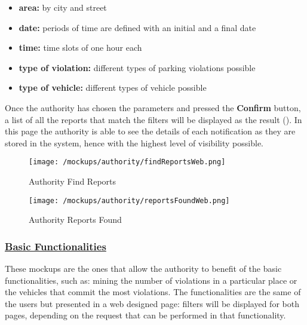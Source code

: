 				\begin{itemize}
					\item \textbf{area:} by city and street
					\item \textbf{date:} periods of time are defined with an initial and a final date
					\item \textbf{time:} time slots of one hour each
					\item \textbf{type of violation:} different types of parking violations possible
					\item \textbf{type of vehicle:} different types of vehicle possible
				\end{itemize} 
			
				Once the authority has chosen the parameters and pressed the \textbf{Confirm} button, a list of all the reports that match the filters will be displayed as the result (). In this page the authority is able to see the details of each notification as they are stored in the system, hence with the highest level of visibility possible.\\
				
				\newpage
				
				\begin{figure}[ht!]
					\centering
					\texttt{[image: /mockups/authority/findReportsWeb.png]}
					\caption{\label{fig:findReportsWeb} Authority Find Reports}
				\end{figure}
			
				\vspace{1cm}
			
				\begin{figure}[ht!]
					\centering
					\texttt{[image: /mockups/authority/reportsFoundWeb.png]}
					\caption{\label{fig:reportsFoundWeb} Authority Reports Found}
				\end{figure}
			
				\newpage
			
			\subsubsection[Basic Functionalities]{\hyperlink{toc}{Basic Functionalities}}
				\label{sec:authorityBasicFunctionalities}
				
				These mockups are the ones that allow the authority to benefit of the basic functionalities, such as: mining the number of violations in a particular place or the vehicles that commit the most violations. The functionalities are the same of the users but presented in a web designed page: filters will be displayed for both pages, depending on the request that can be performed in that functionality.
				
